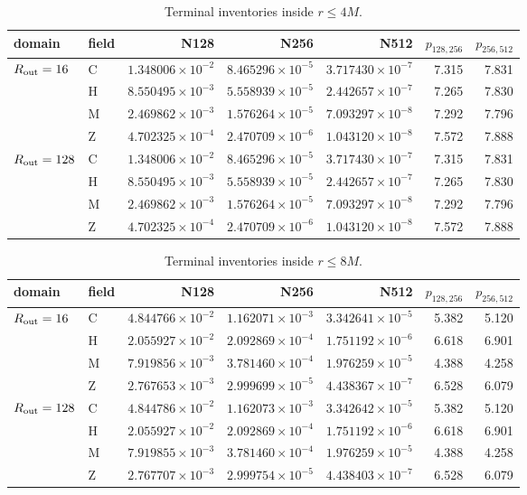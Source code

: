 \documentclass[11pt]{article}
\begin{document}
\begin{table}[H]\centering\scriptsize
\begin{tabular}{llrrrrr}
\toprule
domain & field & N128 & N256 & N512 & $p_{128,256}$ & $p_{256,512}$\\
\midrule
$R_{\rm out}=16$ & C & $1.348006{\times}10^{-2}$ & $8.465296{\times}10^{-5}$ & $3.717430{\times}10^{-7}$ & 7.315 & 7.831\\
 & H & $8.550495{\times}10^{-3}$ & $5.558939{\times}10^{-5}$ & $2.442657{\times}10^{-7}$ & 7.265 & 7.830\\
 & M & $2.469862{\times}10^{-3}$ & $1.576264{\times}10^{-5}$ & $7.093297{\times}10^{-8}$ & 7.292 & 7.796\\
 & Z & $4.702325{\times}10^{-4}$ & $2.470709{\times}10^{-6}$ & $1.043120{\times}10^{-8}$ & 7.572 & 7.888\\
$R_{\rm out}=128$ & C & $1.348006{\times}10^{-2}$ & $8.465296{\times}10^{-5}$ & $3.717430{\times}10^{-7}$ & 7.315 & 7.831\\
 & H & $8.550495{\times}10^{-3}$ & $5.558939{\times}10^{-5}$ & $2.442657{\times}10^{-7}$ & 7.265 & 7.830\\
 & M & $2.469862{\times}10^{-3}$ & $1.576264{\times}10^{-5}$ & $7.093297{\times}10^{-8}$ & 7.292 & 7.796\\
 & Z & $4.702325{\times}10^{-4}$ & $2.470709{\times}10^{-6}$ & $1.043120{\times}10^{-8}$ & 7.572 & 7.888\\
\bottomrule
\end{tabular}
\caption{Terminal inventories inside $r\le4M$.}
\end{table}

\begin{table}[H]\centering\scriptsize
\begin{tabular}{llrrrrr}
\toprule
domain & field & N128 & N256 & N512 & $p_{128,256}$ & $p_{256,512}$\\
\midrule
$R_{\rm out}=16$ & C & $4.844766{\times}10^{-2}$ & $1.162071{\times}10^{-3}$ & $3.342641{\times}10^{-5}$ & 5.382 & 5.120\\
 & H & $2.055927{\times}10^{-2}$ & $2.092869{\times}10^{-4}$ & $1.751192{\times}10^{-6}$ & 6.618 & 6.901\\
 & M & $7.919856{\times}10^{-3}$ & $3.781460{\times}10^{-4}$ & $1.976259{\times}10^{-5}$ & 4.388 & 4.258\\
 & Z & $2.767653{\times}10^{-3}$ & $2.999699{\times}10^{-5}$ & $4.438367{\times}10^{-7}$ & 6.528 & 6.079\\
$R_{\rm out}=128$ & C & $4.844786{\times}10^{-2}$ & $1.162073{\times}10^{-3}$ & $3.342642{\times}10^{-5}$ & 5.382 & 5.120\\
 & H & $2.055927{\times}10^{-2}$ & $2.092869{\times}10^{-4}$ & $1.751192{\times}10^{-6}$ & 6.618 & 6.901\\
 & M & $7.919855{\times}10^{-3}$ & $3.781460{\times}10^{-4}$ & $1.976259{\times}10^{-5}$ & 4.388 & 4.258\\
 & Z & $2.767707{\times}10^{-3}$ & $2.999754{\times}10^{-5}$ & $4.438403{\times}10^{-7}$ & 6.528 & 6.079\\
\bottomrule
\end{tabular}
\caption{Terminal inventories inside $r\le8M$.}
\end{table}
\end{document}
